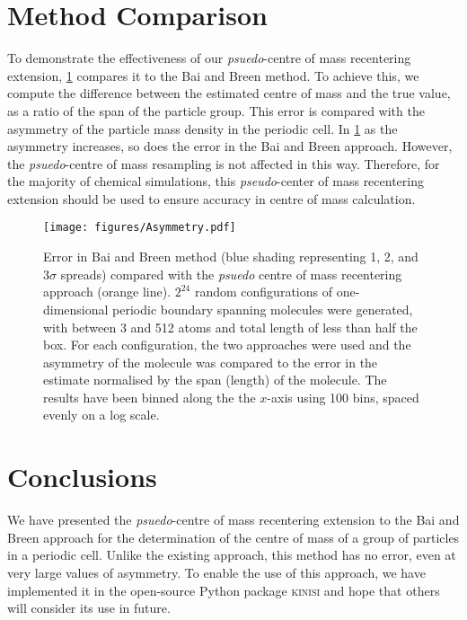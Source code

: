 \documentclass[reprint,superscriptaddress,nobibnotes,amsmath,amssymb,aip]{revtex4-2}
\begin{document}
\section{Method Comparison}

To demonstrate the effectiveness of our \emph{psuedo}-centre of mass recentering extension, \cref{fig:method_comparison} compares it to the Bai and Breen method.
To achieve this, we compute the difference between the estimated centre of mass and the true value, as a ratio of the span of the particle group. 
This error is compared with the asymmetry of the particle mass density in the periodic cell\cite{xioajun_on_1991}.
In \cref{fig:method_comparison} as the asymmetry increases, so does the error in the Bai and Breen approach. 
However, the \emph{psuedo}-centre of mass resampling is not affected in this way. 
Therefore, for the majority of chemical simulations, this \emph{pseudo}-center of mass recentering extension should be used to ensure accuracy in centre of mass calculation. 
%
\begin{figure}
    \centering
    \texttt{[image: figures/Asymmetry.pdf]}
    \caption{Error in Bai and Breen method (blue shading representing 1, 2, and 3$\sigma$ spreads) compared with the \emph{psuedo} centre of mass recentering approach (orange line). 
    $2^24$ random configurations of one-dimensional periodic boundary spanning molecules were generated, with between 3 and 512 atoms and total length of less than half the box. 
    For each configuration, the two approaches were used and the asymmetry of the molecule\cite{xioajun_on_1991} was compared to the error in the estimate normalised by the span (length) of the molecule. 
    The results have been binned along the the $x$-axis using 100 bins, spaced evenly on a log scale.}
    \label{fig:method_comparison}
\end{figure}
%

\section{Conclusions}

We have presented the \emph{psuedo}-centre of mass recentering extension to the Bai and Breen approach for the determination of the centre of mass of a group of particles in a periodic cell. 
Unlike the existing approach, this method has no error, even at very large values of asymmetry.
To enable the use of this approach, we have implemented it in the open-source Python package \textsc{kinisi}\cite{mccluskey_kinisi_2024} and hope that others will consider its use in future. 
\end{document}

